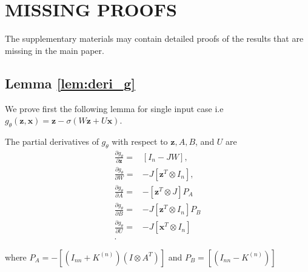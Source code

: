 \documentclass[twoside]{article}
\begin{document}
\section{MISSING PROOFS}

The supplementary materials may contain detailed proofs of the results that are missing in the main paper.


\subsection{Lemma \ref{lem:deri_g}}
\label{proof:deri_g}

We prove first the following lemma for single input case i.e $g_\theta(\mathbf{z}, \mathbf{x}) = \mathbf{z} - \sigma(W \mathbf{z} + U \mathbf{x})$.

\begin{lemma}
The partial derivatives of $g_\theta$ with respect to $\mathbf{z}, A, B$, and $U$ are
\begin{align*}
    \frac{\partial g_\theta}{\partial \mathbf{z}} =& \left[I_{n}- J W\right], \\
    \frac{\partial g_\theta}{\partial W} =& -J \left[\mathbf{z}^{T} \otimes I_{n} \right], \\
    \frac{\partial g_\theta}{\partial A} =& - \left[\mathbf{z}^{T} \otimes J\right]P_A \\
    \frac{\partial g_\theta}{\partial B} =& - J \left[\mathbf{z}^{T} \otimes I_{n} \right]P_B\\
    \frac{\partial g_\theta}{\partial U} =& - J \left[\mathbf{x}^{T} \otimes I_{n}\right]\\.
\end{align*}

where $P_A = - \left[(I_{nn} + K^{(n)})(I \otimes A^T)\right]$ and $P_B = \left[(I_{nn} - K^{(n)})\right]$
\end{lemma}
\end{document}
